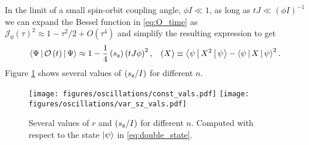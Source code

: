 \documentclass[nofootinbib,notitlepage,11pt]{revtex4-2}
\newcommand{\f}[2]{\dfrac{#1}{#2}} %
\newcommand{\p}[1]{\left(#1\right)} %
\newcommand{\bk}{\Braket} %
\newcommand{\1}{\mathds{1}}
\newcommand{\z}{\text{z}}
\newcommand{\J}{\mathcal{J}}
\renewcommand{\O}{\mathcal{O}}
\let\var\relax
\DeclareMathOperator{\var}{var}
\begin{document}
In the limit of a small spin-orbit coupling angle, $\phi I\ll1$, as
long as $tJ\ll\p{\phi I}^{-1}$ we can expand the Bessel function in
\eqref{eq:O_time} as $\J_0\p{\tau}^2\approx1-\tau^2/2+O\p{\tau^4}$ and
simplify the resulting expression to get
\begin{align}
  \bk{\Psi|\O\p{t}|\Psi}
  \approx 1 - \f14 \var\p{s_\z} \p{tJ\phi}^2,
  &&
  \var\p{X} \equiv \bk{\psi|X^2|\psi} - \bk{\psi|X|\psi}^2.
\end{align}
Figure \ref{fig:limiting_vals} shows several values of
$\var\p{s_\z/I}$ for different $n$.

\begin{figure}
  \centering
  \texttt{[image: figures/oscillations/const\_vals.pdf]}
  \texttt{[image: figures/oscillations/var\_sz\_vals.pdf]}
  \caption{Several values of $r$ and $\var\p{s_\z/I}$ for different
    $n$.  Computed with respect to the state $\ket\psi$ in
    \eqref{eq:double_state}.}
  \label{fig:limiting_vals}
\end{figure}
\end{document}
